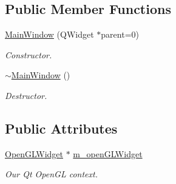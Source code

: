 \subsection*{Public Member Functions}
\begin{DoxyCompactItemize}
\item 
\hypertarget{class_main_window_a8b244be8b7b7db1b08de2a2acb9409db}{\hyperlink{class_main_window_a8b244be8b7b7db1b08de2a2acb9409db}{Main\-Window} (Q\-Widget $\ast$parent=0)}\label{class_main_window_a8b244be8b7b7db1b08de2a2acb9409db}

\begin{DoxyCompactList}\small\item\em Constructor. \end{DoxyCompactList}\item 
\hypertarget{class_main_window_ae98d00a93bc118200eeef9f9bba1dba7}{\hyperlink{class_main_window_ae98d00a93bc118200eeef9f9bba1dba7}{$\sim$\-Main\-Window} ()}\label{class_main_window_ae98d00a93bc118200eeef9f9bba1dba7}

\begin{DoxyCompactList}\small\item\em Destructor. \end{DoxyCompactList}\end{DoxyCompactItemize}
\subsection*{Public Attributes}
\begin{DoxyCompactItemize}
\item 
\hypertarget{class_main_window_af310504f60344259d8a43e495e90e54d}{\hyperlink{class_open_g_l_widget}{Open\-G\-L\-Widget} $\ast$ \hyperlink{class_main_window_af310504f60344259d8a43e495e90e54d}{m\-\_\-open\-G\-L\-Widget}}\label{class_main_window_af310504f60344259d8a43e495e90e54d}

\begin{DoxyCompactList}\small\item\em Our Qt Open\-G\-L context. \end{DoxyCompactList}\end{DoxyCompactItemize}
